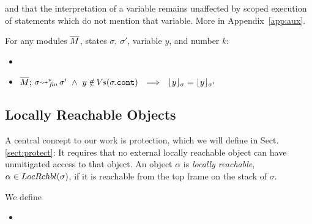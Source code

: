 {\vspace{.05cm}

and that 
the interpretation of a variable remains unaffected by
scoped execution of statements  which do not mention that variable. %
More  in Appendix~\ref{app:aux}.

\begin{lemma}
\label{l:var:unaffect}
For any modules $\overline{M}$, states $\sigma$, $\sigma'$,  variable $y$, and number $k$:
\begin{itemize}
\item
\label{carInFrame}
\item
$\leadstoBoundedStarFin {\Mtwo}  {\sigma}  {\sigma'} \ \wedge \ y\notin \vs(\sigma.\prg{cont}) \ \ \Longrightarrow \ \  \interpret \sigma y =  \interpret {\sigma'} y$
\end{itemize}

\end{lemma}


  \subsection{{{Locally} Reachable  Objects}}

 {A central concept to our work is %
protection, which we will define in   Sect. \ref{sect:protect}: It requires that no external locally reachable object  can have unmitigated access to that object.}
An object $\alpha$ is  \emph{locally reachable}, $\alpha \in  LocRchbl(\sigma) $, if it is reachable from the top frame on the stack of $\sigma$.
 
\begin{definition} We define 
\begin{itemize}
\item
{}
\end{itemize}
\end{definition}

}
